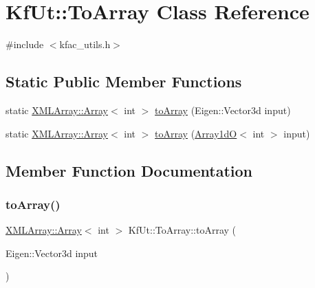 \hypertarget{classKfUt_1_1ToArray}{}\section{Kf\+Ut\+:\+:To\+Array Class Reference}
\label{classKfUt_1_1ToArray}


{\ttfamily \#include $<$kfac\+\_\+utils.\+h$>$}

\subsection*{Static Public Member Functions}
\begin{DoxyCompactItemize}
\item 
static \mbox{\hyperlink{classXMLArray_1_1Array}{X\+M\+L\+Array\+::\+Array}}$<$ int $>$ \mbox{\hyperlink{classKfUt_1_1ToArray_ac97892c7b8ae265fe9d91d3f823b3f98}{to\+Array}} (Eigen\+::\+Vector3d input)
\item 
static \mbox{\hyperlink{classXMLArray_1_1Array}{X\+M\+L\+Array\+::\+Array}}$<$ int $>$ \mbox{\hyperlink{classKfUt_1_1ToArray_a272ebce4969f38835c7a503a85a4f8d3}{to\+Array}} (\mbox{\hyperlink{classADAT_1_1Array1dO}{Array1dO}}$<$ int $>$ input)
\end{DoxyCompactItemize}


\subsection{Member Function Documentation}
\mbox{\label{classKfUt_1_1ToArray_ac97892c7b8ae265fe9d91d3f823b3f98}} 
\subsubsection{\texorpdfstring{toArray()}{toArray()}\hspace{0.1cm}{\footnotesize\ttfamily [1/2]}}
{\footnotesize\ttfamily \mbox{\hyperlink{classXMLArray_1_1Array}{X\+M\+L\+Array\+::\+Array}}$<$ int $>$ Kf\+Ut\+::\+To\+Array\+::to\+Array (\begin{DoxyParamCaption}\item[{Eigen\+::\+Vector3d}]{input }\end{DoxyParamCaption})\hspace{0.3cm}{\ttfamily [static]}}

